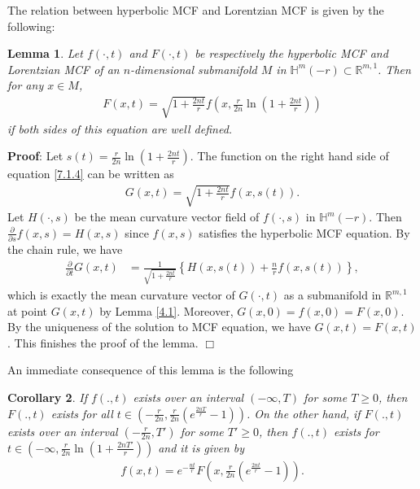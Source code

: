 \documentclass[12pt]{article}
\newtheorem{lem}{Lemma}[section]
\newtheorem{cor}[lem]{Corollary}
\begin{document}
The relation between hyperbolic MCF and Lorentzian MCF is given by the following:
\begin{lem} \label{1.2}
		Let  $f(\cdot,t)$ and $F(\cdot,t)$ be respectively the hyperbolic MCF and Lorentzian MCF of an $n$-dimensional submanifold
$M$ in $\mathbb{H}^{m}(-r) \subset \mathbb R^{m,1}$.  Then for any $x \in M$,
		\begin{align}
			F(x,t)=\sqrt{1+\frac{2nt}{r}}f(x,\frac{r}{2n}\ln(1+\frac{2nt}{r})) \label{7.1.4}
		\end{align}
if both sides of this equation are well defined.
\end{lem}
\noindent
{\bf Proof}:
Let $s(t)=\frac{r}{2n}\ln(1+\frac{2nt}{r})$. The function on the right hand side of equation \eqref{7.1.4}
can be written as
		\begin{align*}
			G(x,t)=\sqrt{1+\frac{2nt}{r}}f(x,s(t)). %
		\end{align*}
Let $H(\cdot,s)$ be the mean curvature vector field of $f(\cdot,s)$ in $\mathbb{H}^{m}(-r)$. Then
$\frac{\partial}{\partial s} f(x,s) = H(x, s)$ since $f(x, s)$ satisfies the hyperbolic MCF equation.
By the chain rule, we have
\begin{align*}
			\frac{\partial}{\partial t} G(x,t)
			&=\frac{1}{\sqrt{1+\frac{2nt}{r}}} \left\{ H(x, s(t)) +\frac{n}{r}f(x,s(t)) \right\},
\end{align*}
which is exactly the mean curvature vector of $G(\cdot , t)$ as a submanifold in $\mathbb R^{m,1} $  at point $G(x, t)$ by Lemma \ref{4.1}. Moreover, $G(x, 0) = f(x,0) = F(x, 0)$. By the uniqueness of the solution to MCF equation,
we have $G(x, t) = F(x, t)$. This finishes the proof of the lemma.
$\Box$
	
An immediate consequence of this lemma is the following
\begin{cor} \label{cor:fF}
If  $f(.,t)$ exists over an interval  $(-\infty, T)$ for some $T\geq 0$, then $F(.,t)$ exists for all
$t\in (-\frac{r}{2n},\frac{r}{2n}(e^{\frac{2nT}{r}}-1))$.
On the other hand, if $F(.,t)$ exists over an interval $(-\frac{r}{2n},T')$ for some $T'\geq 0$, then
$f(.,t)$ exists for $t\in (-\infty, \frac{r}{2n}\ln(1+\frac{2nT'}{r}))$ and it is given by
\begin{align}
		f(x,t)=e^{-\frac{nt}{r}}F(x,\frac{r}{2n}(e^{\frac{2nt}{r}}-1)). \label{4.18}
\end{align}
\end{cor}
\end{document}
